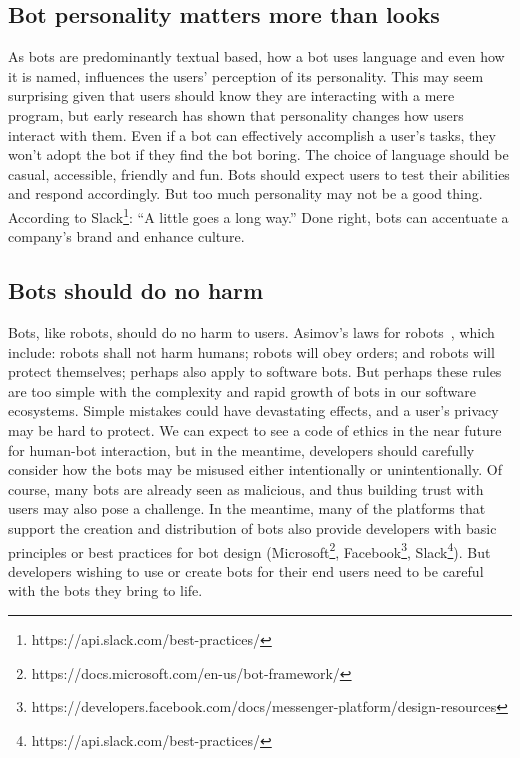 \documentclass{sig-alternate}
\begin{document}
	\subsection{Bot personality matters more than looks} 
	As bots are predominantly textual based, how a bot uses language and even how it is named, influences the users' perception of its personality.  This may seem surprising given that users should know they are interacting with a mere program, but early research has shown that personality changes how users interact with them. 
	Even if a bot can effectively accomplish a user's tasks, they won't adopt the bot if they find the bot boring. The choice of language should be casual, accessible,  friendly and fun.  Bots should expect users to test their abilities and respond accordingly.
	But too much personality may not be a good thing.  According to Slack\footnote{https://api.slack.com/best-practices/}: ``A little goes a long way.''  Done right, bots can accentuate a company's brand and enhance culture.

\subsection{Bots should do no harm}


Bots, like robots, should do no harm to users.  
Asimov's laws for robots~\cite{asimov1950evitable}, which include: 
	robots shall not harm humans; robots will obey orders; and robots will protect themselves; perhaps also apply to software bots.
	But perhaps these rules are too simple with the complexity and rapid growth of bots in our software ecosystems.  Simple mistakes could have devastating effects, and a user's privacy may be hard to protect.  
	We can expect to see a code of ethics in the near future for human-bot interaction, but in the meantime, developers should carefully consider how the bots may be misused either intentionally or unintentionally. Of course, many bots are already seen as malicious, and thus building trust with users may also pose a challenge. 
	 In the meantime, many of the platforms that support the creation and distribution of bots also provide developers with basic principles or best practices for bot design (Microsoft\footnote{https://docs.microsoft.com/en-us/bot-framework/}, Facebook\footnote{https://developers.facebook.com/docs/messenger-platform/design-resources}, Slack\footnote{https://api.slack.com/best-practices/}).
	 But developers wishing to use or create bots for their end users need to be careful with the bots they bring to life. 
	
\end{document}
